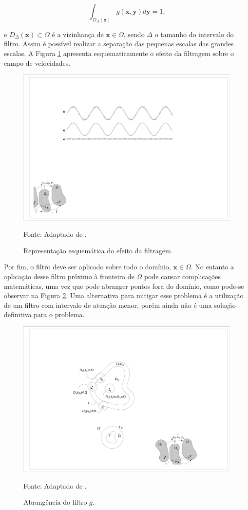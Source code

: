 \documentclass[_ArquivoPrincipal.tex]{subfiles}
\begin{document}
\begin{equation}
    \int_{D_\Delta(\mathbf{x})}{g(\mathbf{x},\mathbf{y})d\mathbf{y}}=1\text{,}
    \label{Filtro2}
\end{equation}

\noindent e $D_\Delta(\mathbf{x})\subset\Omega$ é a vizinhança de $\mathbf{x}\in\Omega$, sendo $\Delta$ o tamanho do intervalo do filtro. Assim é possível realizar a separação das pequenas escalas das grandes escalas. A Figura \ref{fig:Filtragem} apresenta esquematicamente o efeito da filtragem sobre o campo de velocidades.

\begin{figure}[h]
    \centering
    \includegraphics[width=0.75\linewidth]{Figuras/Filtragem.pdf}
    \caption{Representação esquemática do efeito da filtragem.}
    Fonte: Adaptado de .
    \label{fig:Filtragem}
\end{figure}

Por fim, o filtro deve ser aplicado sobre todo o domínio, $\mathbf{x}\in\Omega$. No entanto a aplicação desse filtro próximo à fronteira de $\Omega$ pode causar complicações matemáticas, uma vez que pode abranger pontos fora do domínio, como pode-se observar na Figura \ref{fig:AbrFiltro}. Uma alternativa para mitigar esse problema é a utilização de um filtro com intervalo de atuação menor, porém ainda não é uma solução definitiva para o problema.

\begin{figure}[h]
    \centering
    \includegraphics[width=0.5\linewidth]{Figuras/AbrFiltro.pdf}
    \caption{Abrangência do filtro $g$.}
    Fonte: Adaptado de .
    \label{fig:AbrFiltro}
\end{figure}
\end{document}
